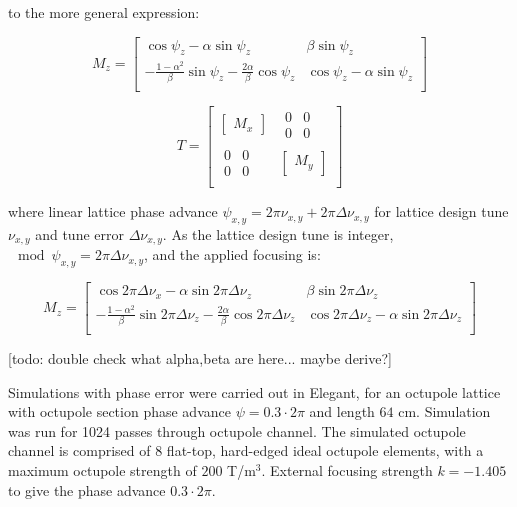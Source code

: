to the more general expression: 

\begin{equation}
M_z = \begin{bmatrix} \cos{\psi_z} - \alpha \sin{\psi_z} & \beta \sin{\psi_z}  \\
-\frac{1-\alpha^2}{\beta}\sin{\psi_z}-\frac{2\alpha}{\beta}\cos{\psi_z} & \cos{\psi_z}-\alpha\sin{\psi_z} \\ \end{bmatrix}
\end{equation}

\begin{equation}
T = 
\begin{bmatrix} 
\begin{bmatrix} M_x \end{bmatrix} & \begin{matrix} 0&0\\0&0 \end{matrix} \\
\begin{matrix} 0&0\\0&0 \end{matrix} & \begin{bmatrix} M_y \end{bmatrix} \\
\end{bmatrix}
\end{equation}

where linear lattice phase advance $\psi_{x,y} = 2\pi\nu_{x,y} + 2\pi \Delta\nu_{x,y}$ for lattice design tune $\nu_{x,y}$ and tune error $\Delta\nu_{x,y}$. As the lattice design tune is integer, $\mod \psi_{x,y} = 2\pi \Delta\nu_{x,y}$, and the applied focusing is:

\begin{equation}
M_z = 
\begin{bmatrix} 
\cos{2\pi\Delta\nu_x} - \alpha \sin{2\pi\Delta\nu_z} & \beta \sin{2\pi\Delta\nu_z} \\
-\frac{1-\alpha^2}{\beta}\sin{2\pi\Delta\nu_z}-\frac{2\alpha}{\beta}\cos{2\pi\Delta\nu_z} & \cos{2\pi\Delta\nu_z}-\alpha\sin{2\pi\Delta\nu_z}\\
\end{bmatrix}
\end{equation}

[todo: double check what alpha,beta are here... maybe derive?]

Simulations with phase error were carried out in Elegant, for an octupole lattice with octupole section phase advance $\psi = 0.3 \cdot 2\pi$ and length $64$ cm. Simulation was run for 1024 passes through octupole channel. The simulated octupole channel is comprised of 8 flat-top, hard-edged ideal octupole elements, with a maximum octupole strength of $200$ T/m$^3$. External focusing strength $k=-1.405$ to give the phase advance $0.3 \cdot 2\pi$.

